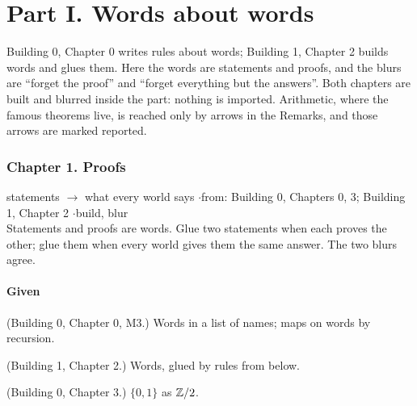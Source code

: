 
\part*{Part I. Words about words}

Building 0, Chapter 0 writes rules about words; Building 1, Chapter 2 builds words and glues them. Here the words are statements and proofs, and the blurs are ``forget the proof'' and ``forget everything but the answers''. Both chapters are built and blurred inside the part: nothing is imported. Arithmetic, where the famous theorems live, is reached only by arrows in the Remarks, and those arrows are marked reported.

\section*{Chapter 1. Proofs}
\begin{center}
{\normalsize statements $\to$ what every world says \quad$\cdot$\quad from: Building 0, Chapters 0, 3; Building 1, Chapter 2 \quad$\cdot$\quad build, blur}\\[4pt]
{\small Statements and proofs are words. Glue two statements when each proves the other; glue them when every world gives them the same answer. The two blurs agree.}
\end{center}

\subsection*{Given}

\begin{lines}
\item[\lab{G1}] (Building 0, Chapter 0, M3.) Words in a list of names; maps on words by recursion.
\item[\lab{G2}] (Building 1, Chapter 2.) Words, glued by rules from below.
\item[\lab{G3}] (Building 0, Chapter 3.) $\{0, 1\}$ as $\mathbb{Z}/2$.
\end{lines}


